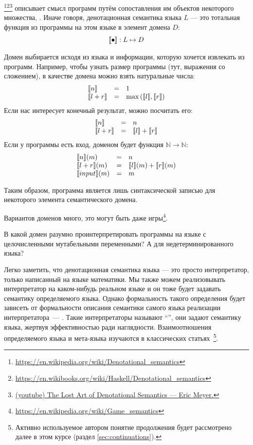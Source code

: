 \footnote{\url{https://en.wikipedia.org/wiki/Denotational_semantics}}\footnote{\url{https://en.wikibooks.org/wiki/Haskell/Denotational_semantics}}\footnote{\href{https://youtu.be/pQyH0p-XJzE?si=TUEzrpHhJZfO7dTF}{(youtube) The Lost Art of Denotational Semantics --- Eric Meyer.}} описывает смысл программ путём сопоставления им объектов некоторого множества, .
Иначе говоря, денотационная семантика языка $L$ --- это тотальная функция из программы на этом языке в элемент домена $D$:
\[
    \llbracket{\bullet}\rrbracket : L \mapsto D
\]

Домен выбирается исходя из языка и информации, которую хочется извлекать из программ.
Например, чтобы узнать размер программы (тут, выражения со сложением), в качестве домена можно взять натуральные числа:
\[
    \begin{array}{lcl}
        \llbracket{n}\rrbracket & = & 1 \\
        \llbracket{l + r}\rrbracket & = & \max{(\llbracket{l}\rrbracket, \llbracket{r}\rrbracket)}
    \end{array}
\]
Если нас интересует конечный результат, можно посчитать его:
\[
    \begin{array}{lcl}
        \llbracket{n}\rrbracket & = & n \\
        \llbracket{l + r}\rrbracket & = & \llbracket{l}\rrbracket + \llbracket{r}\rrbracket
    \end{array}
\]
Если у программы есть вход, доменом будет функция $\mathbb{N}\to\mathbb{N}$:
\[
    \begin{array}{lcl}
        \llbracket{n}\rrbracket(m) & = & n \\
        \llbracket{l + r}\rrbracket(m) & = & \llbracket{l}\rrbracket(m) + \llbracket{r}\rrbracket(m) \\
        \llbracket{input}\rrbracket(m) & = & m
    \end{array}
\]

Таким образом, программа является лишь синтаксической записью для некоторого элемента семантического домена.

Вариантов доменов много, это могут быть даже игры\footnote{\url{https://en.wikipedia.org/wiki/Game_semantics}}. %

\begin{task}
    В какой домен разумно проинтерпретировать программы на языке с целочисленными мутабельными переменными?
    А для недетерминированного языка?
\end{task}

Легко заметить, что денотационная семантика языка --- это просто интерпретатор, только написанный на языке математики.
Мы также можем реализовывать интерпретатор на каком-нибудь реальном языке и он тоже будет задавать семантику определяемого языка.
Однако формальность такого определения будет зависеть от формальности описания семантики самого языка реализации интерпретатора~--- .
Такие интерпретаторы называют ``'', они задают семантику языка, жертвуя эффективностью ради наглядности.
Взаимоотношения определяемого языка и мета-языка изучаются в классических статьях~\cite{reynolds1972definitional,reynolds1998definitional}\footnote{Активно используемое автором понятие продолжения будет рассмотрено далее в этом курсе (раздел \ref{sec:continuations}).}.

